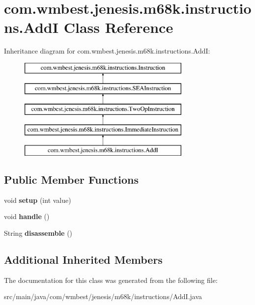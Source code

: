 \hypertarget{classcom_1_1wmbest_1_1jenesis_1_1m68k_1_1instructions_1_1AddI}{\section{com.\-wmbest.\-jenesis.\-m68k.\-instructions.\-Add\-I Class Reference}
\label{classcom_1_1wmbest_1_1jenesis_1_1m68k_1_1instructions_1_1AddI}
}
Inheritance diagram for com.\-wmbest.\-jenesis.\-m68k.\-instructions.\-Add\-I\-:\begin{figure}[H]
\begin{center}
\leavevmode
\includegraphics[height=5.000000cm]{classcom_1_1wmbest_1_1jenesis_1_1m68k_1_1instructions_1_1AddI}
\end{center}
\end{figure}
\subsection*{Public Member Functions}
\begin{DoxyCompactItemize}
\item 
\hypertarget{classcom_1_1wmbest_1_1jenesis_1_1m68k_1_1instructions_1_1AddI_afbd2e5dbedea11c1f6625b39e5665b49}{void {\bfseries setup} (int value)}\label{classcom_1_1wmbest_1_1jenesis_1_1m68k_1_1instructions_1_1AddI_afbd2e5dbedea11c1f6625b39e5665b49}

\item 
\hypertarget{classcom_1_1wmbest_1_1jenesis_1_1m68k_1_1instructions_1_1AddI_a5a37a9108e5bb4f8582e1cb6a8d4cb37}{void {\bfseries handle} ()}\label{classcom_1_1wmbest_1_1jenesis_1_1m68k_1_1instructions_1_1AddI_a5a37a9108e5bb4f8582e1cb6a8d4cb37}

\item 
\hypertarget{classcom_1_1wmbest_1_1jenesis_1_1m68k_1_1instructions_1_1AddI_add495e8050021fab4749cb0552a86429}{String {\bfseries disassemble} ()}\label{classcom_1_1wmbest_1_1jenesis_1_1m68k_1_1instructions_1_1AddI_add495e8050021fab4749cb0552a86429}

\end{DoxyCompactItemize}
\subsection*{Additional Inherited Members}


The documentation for this class was generated from the following file\-:\begin{DoxyCompactItemize}
\item 
src/main/java/com/wmbest/jenesis/m68k/instructions/Add\-I.\-java\end{DoxyCompactItemize}
